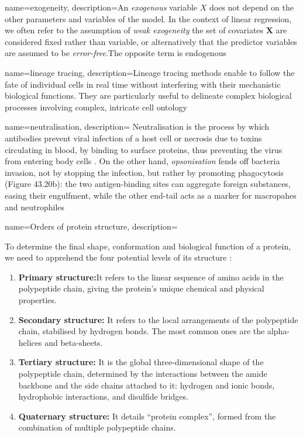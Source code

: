 {name=exogeneity, 
description={An \textit{exogenous} variable $X$ does not depend on the other parameters and variables of the model. In the context of linear regression, we often refer to the assumption of \textit{weak exogeneity} the set of covariates $\boldsymbol{X}$ are considered fixed rather than variable, or alternatively that the predictor variables are assumed to be \textit{error-free}.The opposite term is endogenous}}

{name=lineage tracing, 
description={Lineage tracing methods enable to follow the fate of individual cells in real time without interfering with their mechanistic biological functions. They are particularly useful to delineate complex biological processes involving complex, intricate cell ontology}}

{name=neutralisation, 
description={
Neutralisation is the process by which antibodies prevent viral infection of a host cell or necrosis due to toxins circulating in blood, by binding to surface proteins, thus preventing the virus from entering body cells \autocite[Figure 20a, Chapter 43]{campbell_etal20}.
On the other hand, \textit{opsonisation} fends off bacteria invasion, not by stopping the infection, but rather by promoting phagocytosis (Figure 43.20b): the two antigen-binding sites can aggregate foreign substances, easing their engulfment, while the other end-tail acts as a marker for macropahes and neutrophiles \autocite[Figure 20b, Chapter 43]{campbell_etal20}
}}

{name=Orders of protein structure, 
description={To determine the final shape, conformation and biological function of a protein, we need to apprehend 
the four potential levels of its structure \autocite{wilk-blaszczak}:
\begin{enumerate}
    \item \textbf{Primary structure:}It refers to the linear sequence of amino acids in the polypeptide chain, giving the protein's unique chemical and physical properties.
    \item \textbf{Secondary structure:} It refers to the local arrangements of the polypeptide chain, stabilised by hydrogen bonds. The most common ones are the alpha-helices and beta-sheets.  
    \item \textbf{Tertiary structure:} It is the global three-dimensional shape of the polypeptide chain, determined by the interactions between the amide backbone and the side chains attached to it: hydrogen and ionic bonds, hydrophobic interactions, and disulfide bridges.
    \item \textbf{Quaternary structure:} It details \enquote{protein complex},  formed from the combination of multiple polypeptide chains. 
\end{enumerate}
}}

